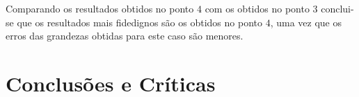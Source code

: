 \documentclass[%
  reprint,
  nofootinbib,
  amsmath,amssymb,
  aps,
  10pt,
]{revtex4-1}
\begin{document}
Comparando os resultados obtidos no ponto $4$ com os obtidos no ponto $3$ conclui-se que os resultados mais fidedignos são os obtidos no ponto $4$, uma vez que os erros das grandezas obtidas para este caso são menores.
\section{Conclusões e Críticas}
\label{s:conclu}




\nocite{*}
{}
\end{document}
